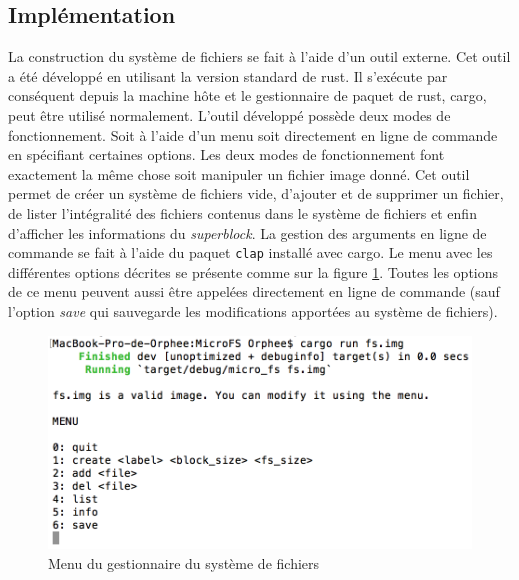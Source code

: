 
\subsection{Implémentation}
La construction du système de fichiers se fait à l'aide d'un outil externe. Cet
outil a été développé en utilisant la version standard de rust. Il s'exécute
par conséquent depuis la machine hôte et le gestionnaire de paquet de rust, cargo,
peut être utilisé normalement. L'outil développé possède deux
modes de fonctionnement. Soit à l'aide d'un menu soit directement en ligne de
commande en spécifiant certaines options. Les deux modes de fonctionnement
font exactement la même chose soit manipuler un fichier image donné. Cet outil permet
de créer un système de fichiers vide, d'ajouter et de supprimer un fichier, de
lister l'intégralité des fichiers contenus dans le système de fichiers et enfin
d'afficher les informations du \textit{superblock}. La gestion des arguments en
ligne de commande se fait à l'aide du paquet \texttt{clap} installé avec
cargo. Le menu avec les différentes options décrites se présente comme sur la figure
\ref{microfs_menu}. Toutes les options de ce menu peuvent aussi être appelées
directement en ligne de commande (sauf l'option \textit{save} qui sauvegarde les
modifications apportées au système de fichiers). \\ 

\begin{figure}[!h]
  \centering
  \includegraphics[scale=0.8]{images/microfs_menu.png}
  \caption{Menu du gestionnaire du système de fichiers}
  \label{microfs_menu}
\end{figure}

